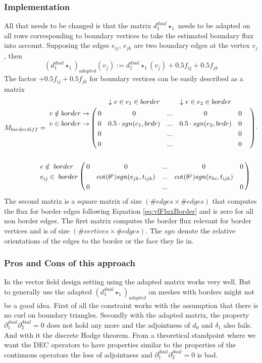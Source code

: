\subsubsection{Implementation}
All that needs to be changed is that the matrix $d_1^{dual} \star_1$ needs to be adapted on all rows corresponding to boundary vertices to take the estimated boundary flux into account. Supposing the edges $e_{ij}$, $e_{jk}$ are two boundary edges at the vertex $v_j$, then
\[(d_1^{dual} \star_1)_{adapted} (v_j) := d_1^{dual} \star_1(v_j) + 0.5 f_{ij} + 0.5 f_{jk}\]
The factor $+ 0.5 f_{ij} + 0.5 f_{jk}$ for boundary vertices can be easily described as a matrix
\begin{align*}M_{borderdiff}& = \bordermatrix{ 
& & \downarrow v \in e_1 \in border & &\downarrow v\in e_{2} \in border& & \cr
v \notin border \rightarrow & 0 & 0& ...& 0& 0 \cr
v\in border \rightarrow & 0 & 0.5 \cdot sgn(e_{1}, brdr) & ... & 0.5 \cdot sgn(e_{2}, brdr)&0\cr
& 0 & & ...& & 0 \cr
& 0 & & ...& & 0
} \cdot \nonumber \\
& \bordermatrix{ 
& & & & &\cr
e \notin \; border & 0 & 0 & ...&0 & 0 \cr
e_{ij} \in\;border& & \cot(\theta^i)sgn(e_{jk}, t_{ijk}) & ... & \cot(\theta^j)sgn(e_{ki}, t_{ijk}) & \cr
& 0 & & ...& & 0
}\end{align*}
The second matrix is a square matrix of size $(\# edges \times \# edges)$ that computes the flux for border edges following Equation \ref{eq:vfFluxBorder} and is zero for all non border edges. The first matrix computes the border flux relevant for border vertices and is of size $(\#vertices \times \#edges)$. The $sgn$ denote the relative orientations of the edges to the border or the face they lie in.


\subsubsection{ Pros and Cons of this approach} In the vector field design setting using the adapted matrix works very well. But to generally use the adapted $(d_1^{dual} \star_1)_{adapted}$ on meshes with borders might not be a good idea. First of all the constraint works with the assumption that there is no curl on boundary triangles. Secondly  with the adapted matrix, the property $\partial^{dual}_1\partial^{dual}_2 = 0$ does not hold any more and the adjointness of $d_0$ and $\delta_1$ also fails. And with it the discrete Hodge theorem. 
From a theoretical standpoint where we want the DEC operators to have properties similar to the properties of the continuous operators the loss of adjointness and $\partial^{dual}_1\partial^{dual}_2 = 0$ is bad. 

